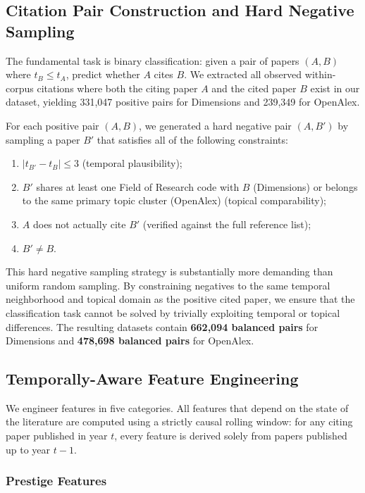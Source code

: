 \documentclass[12pt,a4paper]{article}
\begin{document}
\subsection{Citation Pair Construction and Hard Negative Sampling}

The fundamental task is binary classification: given a pair of papers $(A, B)$
where $t_B \le t_A$, predict whether $A$ cites $B$. We extracted all observed
within-corpus citations where both the citing paper $A$ and the cited paper $B$
exist in our dataset, yielding 331,047 positive pairs for Dimensions and 239,349
for OpenAlex.

For each positive pair $(A, B)$, we generated a hard negative pair $(A, B')$ by
sampling a paper $B'$ that satisfies all of the following constraints:
\begin{enumerate}
  \item $|t_{B'} - t_B| \le 3$ (temporal plausibility);
  \item $B'$ shares at least one Field of Research code with $B$ (Dimensions) or
    belongs to the same primary topic cluster (OpenAlex) (topical comparability);
  \item $A$ does not actually cite $B'$ (verified against the full reference list);
  \item $B' \ne B$.
\end{enumerate}

This hard negative sampling strategy is substantially more demanding than uniform
random sampling. By constraining negatives to the same temporal neighborhood and
topical domain as the positive cited paper, we ensure that the classification task
cannot be solved by trivially exploiting temporal or topical differences. The
resulting datasets contain \textbf{662,094 balanced pairs} for Dimensions and
\textbf{478,698 balanced pairs} for OpenAlex.

\subsection{Temporally-Aware Feature Engineering}

We engineer features in five categories. All features that depend on the state of
the literature are computed using a strictly causal rolling window: for any citing
paper published in year $t$, every feature is derived solely from papers published
up to year $t-1$.

\subsubsection{Prestige Features}
\end{document}
